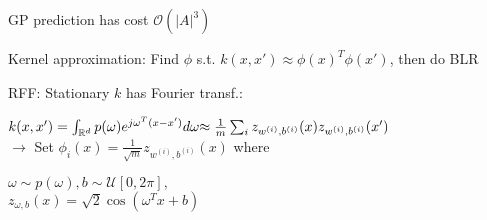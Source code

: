 

 GP prediction has cost $\mathcal{O}(|A|^3)$

Kernel approximation: Find $\phi$ s.t. $k(x,x') \approx \phi(x)^T \phi(x')$, then do BLR

RFF: Stationary $k$ has Fourier transf.: 

$k(x,x') = \int_{\mathbb{R}^d} p(\omega) e^{j \omega^T (x - x')} d\omega
\\ {\approx \frac{1}{m} \sum_i z_{w^{(i)},b^{(i)}}(x) z_{w^{(i)},b^{(i)}}(x')}$\\
$\rightarrow$ Set $\phi_i(x) = \frac{1}{\sqrt{m}} z_{w^{(i)},b^{(i)}}(x)$ where 

$\omega \sim p(\omega), b \sim \mathcal{U}[0, 2\pi],$\\
${z_{\omega, b}(x) = \sqrt{2} \cos(\omega^T x + b)}$
